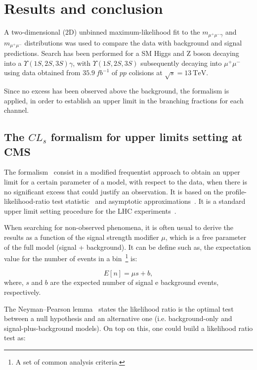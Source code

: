\chapter{Results and conclusion}
\label{chaper_results}

A two-dimensional (2D) unbinned maximum-likelihood fit to the $m_{\mu^{+}\mu^{-}\gamma}$ and $m_{\mu^{+}\mu^{-}}$ distributions was used to compare the data with background and signal predictions. Search has been performed for a SM Higgs and $\mathrm{Z}$ boson decaying into a $\Upsilon(1S,2S,3S)\gamma$, with $\Upsilon(1S,2S,3S)$ subsequently decaying into $\mu^{+}\mu^{-}$ using data obtained from $35.9~fb^{-1}$ of $pp$ colisions at $\sqrt{s}=13~\mathrm{TeV}$. 

Since no excess has been observed above the background, the \CLs formalism is applied, in order to establish an upper limit in the branching fractions for each channel.

\section{The $CL_{s}$ formalism for upper limits setting at CMS}
\label{sec:cls}

The \CLs formalism~\cite{cls_Read_2002} consist in a modified frequentist approach to obtain an upper limit for a certain parameter of a model, with respect to the data, when there is no significant excess that could justify an observation. It is based on the profile-likelihood-ratio test statistic~\cite{profiled_lh} and asymptotic approximations~\cite{asymptotic_cls}. It is a standard upper limit setting procedure for the LHC experiments~\cite{CMS-NOTE-2011-005}.

When searching for non-observed phenomena, it is often usual to derive the results as a function of the signal strength modifier $\mu$, which is a free parameter of the full model (signal + background). It can be define such as, the expectation value for the number of events in a bin~\footnote{A set of common analysis criteria.} is:


\begin{equation}
\label{eqn:signal_strength}
E[n] = \mu s + b,
\end{equation}
where, $s$ and $b$ are the expected number of signal e background events, respectively.

The Neyman–Pearson lemma~\cite{profiled_lh} states the likelihood ratio is the optimal test between a null hypothesis and an alternative one (i.e. background-only and signal-plus-background models). On top on this, one could build a likelihood ratio test as:


